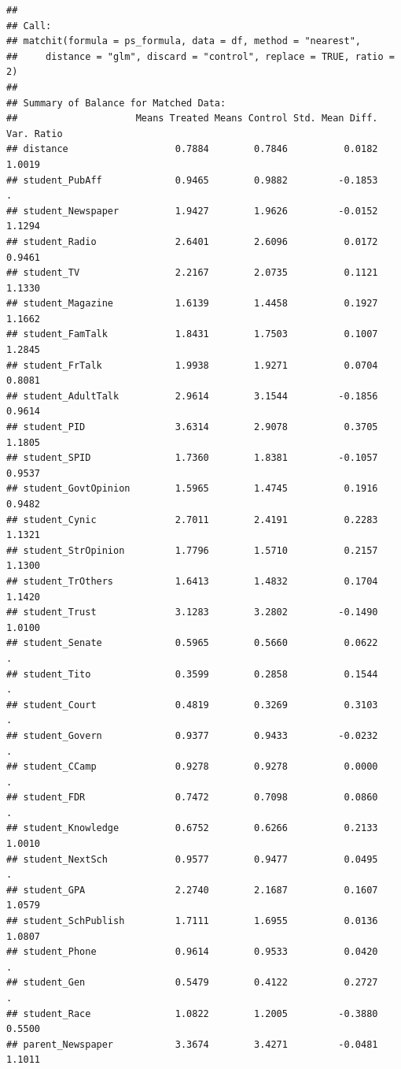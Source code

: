 \documentclass[
]{article}
\begin{document}
\begin{verbatim}
## 
## Call:
## matchit(formula = ps_formula, data = df, method = "nearest", 
##     distance = "glm", discard = "control", replace = TRUE, ratio = 2)
## 
## Summary of Balance for Matched Data:
##                     Means Treated Means Control Std. Mean Diff. Var. Ratio
## distance                   0.7884        0.7846          0.0182     1.0019
## student_PubAff             0.9465        0.9882         -0.1853          .
## student_Newspaper          1.9427        1.9626         -0.0152     1.1294
## student_Radio              2.6401        2.6096          0.0172     0.9461
## student_TV                 2.2167        2.0735          0.1121     1.1330
## student_Magazine           1.6139        1.4458          0.1927     1.1662
## student_FamTalk            1.8431        1.7503          0.1007     1.2845
## student_FrTalk             1.9938        1.9271          0.0704     0.8081
## student_AdultTalk          2.9614        3.1544         -0.1856     0.9614
## student_PID                3.6314        2.9078          0.3705     1.1805
## student_SPID               1.7360        1.8381         -0.1057     0.9537
## student_GovtOpinion        1.5965        1.4745          0.1916     0.9482
## student_Cynic              2.7011        2.4191          0.2283     1.1321
## student_StrOpinion         1.7796        1.5710          0.2157     1.1300
## student_TrOthers           1.6413        1.4832          0.1704     1.1420
## student_Trust              3.1283        3.2802         -0.1490     1.0100
## student_Senate             0.5965        0.5660          0.0622          .
## student_Tito               0.3599        0.2858          0.1544          .
## student_Court              0.4819        0.3269          0.3103          .
## student_Govern             0.9377        0.9433         -0.0232          .
## student_CCamp              0.9278        0.9278          0.0000          .
## student_FDR                0.7472        0.7098          0.0860          .
## student_Knowledge          0.6752        0.6266          0.2133     1.0010
## student_NextSch            0.9577        0.9477          0.0495          .
## student_GPA                2.2740        2.1687          0.1607     1.0579
## student_SchPublish         1.7111        1.6955          0.0136     1.0807
## student_Phone              0.9614        0.9533          0.0420          .
## student_Gen                0.5479        0.4122          0.2727          .
## student_Race               1.0822        1.2005         -0.3880     0.5500
## parent_Newspaper           3.3674        3.4271         -0.0481     1.1011

\end{verbatim}
\end{document}
